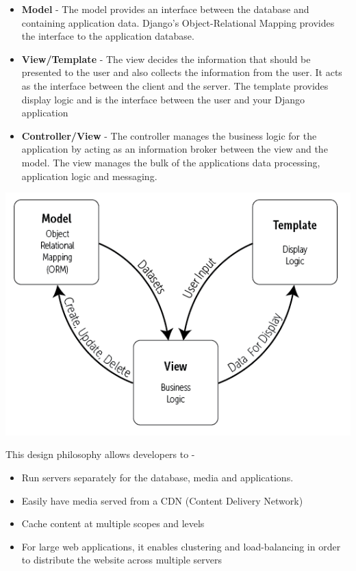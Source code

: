 \documentclass[../thesis.tex]{subfiles}
\begin{document}
\begin{itemize}
	\item \textbf{Model} - The model provides an interface between the database and containing application data. Django’s Object-Relational Mapping provides the interface to the application database.
	\newline
    
	\item \textbf{View/Template} - The view decides the information that should be presented to the user and also collects the information from the user. It acts as the interface between the client and the server. The template provides display logic and is the interface between the user and your Django application
	\newline
    
	\item \textbf{Controller/View} - The controller manages the business logic for the application by acting as an information broker between the view and the model. The view manages the bulk of the applications data processing, application logic and messaging.
	\newline
    
\end{itemize}
\begin{center}
	\includegraphics[scale=0.63]{../images/Django.png}
\end{center}
This design philosophy allows developers to - 
\begin{itemize}
	\item  Run servers separately for the database, media and applications.
	\newline
    
	\item  Easily have media served from a CDN (Content Delivery Network)
	\newline
    
	\item  Cache content at multiple scopes and levels
	\newline
    
	\item  For large web applications, it enables clustering and load-balancing in order to distribute the website across multiple servers
    
\end{itemize}
\end{document}
